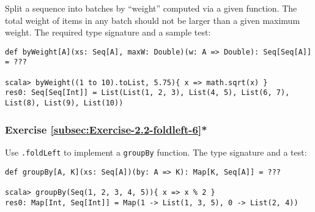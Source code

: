 Split a sequence into batches by ``weight'' computed via a given
function. The total weight of items in any batch should not be larger
than a given maximum weight. The required type signature and a sample
test:
\begin{lstlisting}
def byWeight[A](xs: Seq[A], maxW: Double)(w: A => Double): Seq[Seq[A]] = ???

scala> byWeight((1 to 10).toList, 5.75){ x => math.sqrt(x) }
res0: Seq[Seq[Int]] = List(List(1, 2, 3), List(4, 5), List(6, 7), List(8), List(9), List(10))
\end{lstlisting}
\begin{comment}
Solution:
\begin{lstlisting}
def weightBatching[A](xs: Seq[A], maxW: Double)(w: A => Double): Seq[Seq[A]] = {  
  type Acc = (Seq[Seq[A]], Seq[A], Double)
  val init: Acc = ((Seq(), Seq(), 0.0))
  val (result, rem, _) = xs.foldLeft(init) { case ((seq, rem, weight), x) =>
    val wx = w(x)
    if (wx > maxW) (seq ++ Seq(rem, Seq(x)), Seq(), 0.0)
    else {
      val newWeight = weight + wx
      if (newWeight > maxW) (seq ++ Seq(rem), Seq(x), wx)
      else (seq, rem ++ Seq(x), newWeight)
    }
  }
  result ++ Seq(rem)
}
\end{lstlisting}
\end{comment}


\subsubsection{Exercise \label{subsec:Exercise-2.2-foldleft-6}\ref{subsec:Exercise-2.2-foldleft-6}{*}}

Use \lstinline!.foldLeft! to implement a \lstinline!groupBy! function.
The type signature and a test:
\begin{lstlisting}
def groupBy[A, K](xs: Seq[A])(by: A => K): Map[K, Seq[A]] = ???

scala> groupBy(Seq(1, 2, 3, 4, 5)){ x => x % 2 }
res0: Map[Int, Seq[Int]] = Map(1 -> List(1, 3, 5), 0 -> List(2, 4))
\end{lstlisting}

